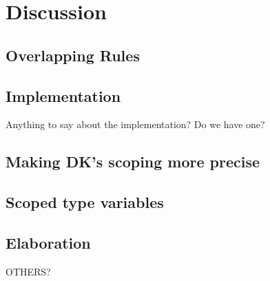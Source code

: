 \section{Discussion}

\subsection{Overlapping Rules} 

\subsection{Implementation}
Anything to say about the implementation? Do we have one?

\subsection{Making DK's scoping more precise}

\subsection{Scoped type variables}

\subsection{Elaboration}

OTHERS?